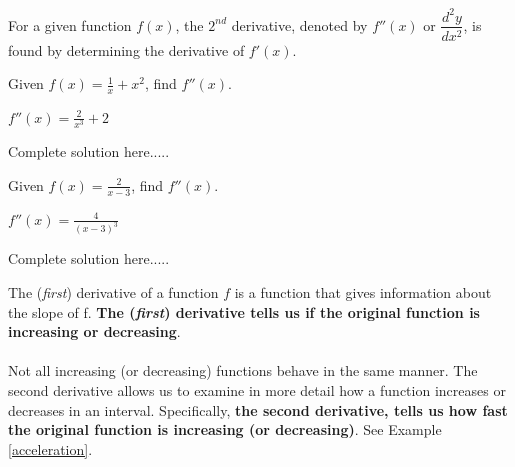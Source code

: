 \noindent For a given function $f(x)$, the $2^{nd}$ derivative, denoted by $f''(x)$ or $\dfrac{d^{2} y}{dx^2}$, is found by determining the derivative of $f'(x)$.  
\begin{example}
Given $f(x)=\displaystyle\frac{1}{x}+x^2$, find $f''(x)$.    %
    \begin{sol}
    $f''(x)=\displaystyle\frac{2}{x^3}+2$
    \end{sol}
    \begin{solL}
    Complete solution here.....
    
    \end{solL}
    
\end{example}
\vspace{0.6in}
\begin{example}
Given $f(x)=\displaystyle\frac{2}{x-3}$, find $f''(x)$. 
    \begin{sol}
    $f''(x)=\displaystyle\frac{4}{(x-3)^3}$
    \end{sol}
    \begin{solL}
    Complete solution here.....
    
    \end{solL}
    
\end{example}
\vspace{0.6in}
\noindent The (\emph{first}) derivative of a function $f$ is a function that gives information about the slope of f. \textbf{The (\emph{first}) derivative tells us if the original function is increasing or decreasing}.\\\\
Not all increasing (or decreasing) functions behave in the same manner. The second derivative allows us to examine in more detail how a function increases or decreases in an interval. Specifically, \textbf{the second derivative, tells us how fast the original function is increasing (or decreasing)}. See Example \ref{acceleration}.

